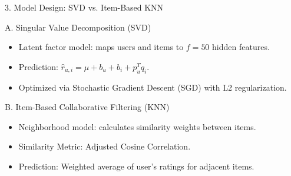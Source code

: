 \documentclass{beamer}
\begin{document}
\begin{frame}{3. Model Design: SVD vs. Item-Based KNN}
  \begin{block}{A. Singular Value Decomposition (SVD)}
    \begin{itemize}
      \item Latent factor model: maps users and items to $f=50$ hidden features.
      \item Prediction: $\hat{r}_{u,i} = \mu + b_u + b_i + p_u^T q_i$.
      \item Optimized via Stochastic Gradient Descent (SGD) with L2 regularization.
    \end{itemize}
  \end{block}
  \begin{block}{B. Item-Based Collaborative Filtering (KNN)}
    \begin{itemize}
      \item Neighborhood model: calculates similarity weights between items.
      \item Similarity Metric: Adjusted Cosine Correlation.
      \item Prediction: Weighted average of user's ratings for adjacent items.
    \end{itemize}
  \end{block}
\end{frame}

\end{document}
